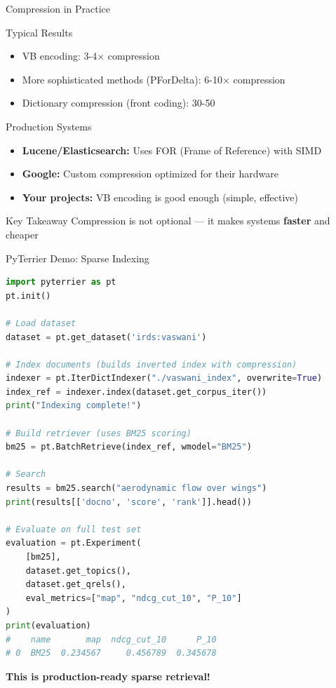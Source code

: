 \documentclass[aspectratio=169]{beamer}
\begin{document}
\begin{frame}[shrink=5]{Compression in Practice}
\begin{block}{Typical Results}
\begin{itemize}
    \item VB encoding: 3-4$\times$ compression
    \item More sophisticated methods (PForDelta): 6-10$\times$ compression
    \item Dictionary compression (front coding): 30-50%
\end{itemize}
\end{block}

\vspace{1em}

\begin{exampleblock}{Production Systems}
\begin{itemize}
    \item \textbf{Lucene/Elasticsearch:} Uses FOR (Frame of Reference) with SIMD
    \item \textbf{Google:} Custom compression optimized for their hardware
    \item \textbf{Your projects:} VB encoding is good enough (simple, effective)
\end{itemize}
\end{exampleblock}

\vspace{1em}

\begin{alertblock}{Key Takeaway}
Compression is not optional --- it makes systems \textbf{faster} and cheaper
\end{alertblock}
\end{frame}

\begin{frame}[fragile,shrink=5]{PyTerrier Demo: Sparse Indexing}
\begin{lstlisting}[language=Python, basicstyle=\ttfamily\tiny]
import pyterrier as pt
pt.init()

# Load dataset
dataset = pt.get_dataset('irds:vaswani')

# Index documents (builds inverted index with compression)
indexer = pt.IterDictIndexer("./vaswani_index", overwrite=True)
index_ref = indexer.index(dataset.get_corpus_iter())
print("Indexing complete!")

# Build retriever (uses BM25 scoring)
bm25 = pt.BatchRetrieve(index_ref, wmodel="BM25")

# Search
results = bm25.search("aerodynamic flow over wings")
print(results[['docno', 'score', 'rank']].head())

# Evaluate on full test set
evaluation = pt.Experiment(
    [bm25],
    dataset.get_topics(),
    dataset.get_qrels(),
    eval_metrics=["map", "ndcg_cut_10", "P_10"]
)
print(evaluation)
#    name       map  ndcg_cut_10      P_10
# 0  BM25  0.234567     0.456789  0.345678
\end{lstlisting}

\textbf{This is production-ready sparse retrieval!}
\end{frame}
\end{document}
